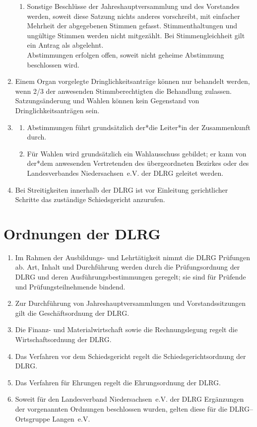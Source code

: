 \documentclass[%
12pt, %
a4paper, %
headsepline, %
parskip, %
headings=normal, %
]{scrreprt}
\begin{document}
\begin{enumerate}
\begin{enumerate}[noitemsep]
        \item Sonstige Beschlüsse der Jahreshauptversammlung und des Vorstandes werden, soweit diese Satzung nichts anderes vorschreibt, mit einfacher Mehrheit der abgegebenen Stimmen gefasst. Stimmenthaltungen und ungültige Stimmen werden nicht mitgezählt. Bei Stimmengleichheit gilt ein Antrag als abgelehnt.\\
          Abstimmungen erfolgen offen, soweit nicht geheime Abstimmung beschlossen wird.
      \end{enumerate}
    \item Einem Organ vorgelegte Dringlichkeitsanträge können nur behandelt werden, wenn 2/3 der anwesenden Stimmberechtigten die Behandlung zulassen. Satzungsänderung und Wahlen können kein Gegenstand von Dringlichkeitsanträgen sein.
    \item \begin{enumerate}[noitemsep]
        \item Abstimmungen führt grundsätzlich der*die Leiter*in der Zusammenkunft durch.
        \item Für Wahlen wird grundsätzlich ein Wahlausschuss gebildet; er kann von der*dem anwesenden Vertretenden des übergeordneten Bezirkes oder des Landesverbandes Niedersachsen~e.V. der DLRG geleitet werden.
      \end{enumerate}
    \item Bei Streitigkeiten innerhalb der DLRG ist vor Einleitung gerichtlicher Schritte das zuständige Schiedsgericht anzurufen.
\end{enumerate}

\section{Ordnungen der DLRG}
\label{sec:ordnungen}
\begin{enumerate}
    \item Im Rahmen der Ausbildungs- und Lehrtätigkeit nimmt die DLRG Prüfungen ab. Art, Inhalt und Durchführung werden durch die Prüfungsordnung der DLRG und deren Ausführungsbestimmungen geregelt; sie sind für Prüfende und Prüfungsteilnehmende bindend.
    \item Zur Durchführung von Jahreshauptversammlungen und Vorstandssitzungen gilt die Geschäftsordnung der DLRG.
    \item Die Finanz- und Materialwirtschaft sowie die Rechnungslegung regelt die Wirtschaftsordnung der DLRG.
    \item Das Verfahren vor dem Schiedsgericht regelt die Schiedsgerichtsordnung der DLRG.
    \item Das Verfahren für Ehrungen regelt die Ehrungsordnung der DLRG.
    \item Soweit für den Landesverband Niedersachsen~e.V. der DLRG Ergänzungen der vorgenannten Ordnungen beschlossen wurden, gelten diese für die DLRG--Ortsgruppe Langen~e.V.
\end{enumerate}
\end{document}
